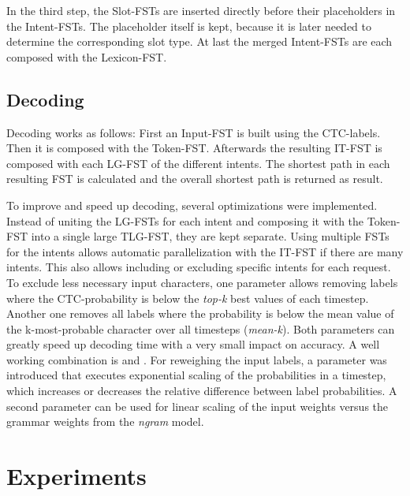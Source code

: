 \documentclass[a4paper]{article}
\newcommand{\comment}[1]{}
\begin{document}
In the third step, the Slot-FSTs are inserted directly before their placeholders in the Intent-FSTs.
The placeholder itself is kept, because it is later needed to determine the corresponding slot type.
At last the merged Intent-FSTs are each composed with the Lexicon-FST.

\comment{
\begin{figure*}[!htbp]
	\centering
	\texttt{[image: itc\_merged.jpg]}
	\caption{Combined Intent-Slot-FST.}
	\label{fig:itc_merged}
\end{figure*}
}

\subsection{Decoding}

Decoding works as follows: First an Input-FST is built using the CTC-labels. Then it is composed with the Token-FST. Afterwards the resulting IT-FST is composed with each LG-FST of the different intents. The shortest path in each resulting FST is calculated and the overall shortest path is returned as result.

To improve and speed up decoding, several optimizations were implemented. Instead of uniting the LG-FSTs for each intent and composing it with the Token-FST into a single large TLG-FST, they are kept separate. Using multiple FSTs for the intents allows automatic parallelization with the IT-FST if there are many intents. This also allows including or excluding specific intents for each request.
To exclude less necessary input characters, one parameter allows removing labels where the CTC-probability is below the \textit{top-k} best values of each timestep. Another one removes all labels where the probability is below the mean value of the k-most-probable character over all timesteps (\textit{mean-k}). Both parameters can greatly speed up decoding time with a very small impact on accuracy. A well working combination is  and .
For reweighing the input labels, a parameter was introduced that executes exponential scaling of the probabilities in a timestep, which increases or decreases the relative difference between label probabilities. A second parameter can be used for linear scaling of the input weights versus the grammar weights from the \textit{ngram} model. 



\section{Experiments}
\label{sec:exper}
\end{document}
